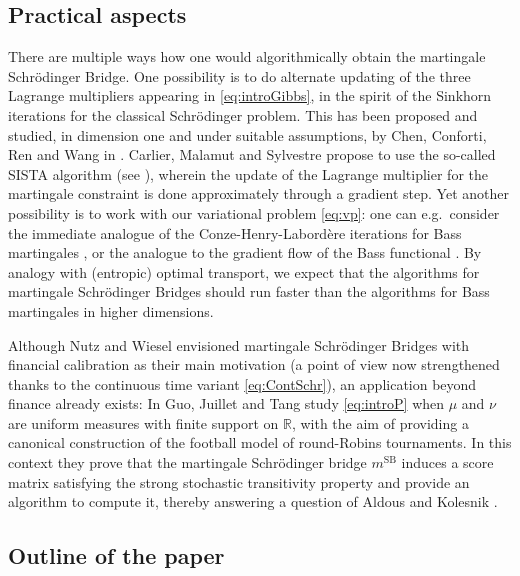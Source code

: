 \documentclass[reqno, a4paper]{amsart}
\newcommand{\msb}{m^{\text{SB}}}
\theoremstyle{plain}
\theoremstyle{definition}
\theoremstyle{remark}
\numberwithin{equation}{section}
\numberwithin{theorem}{section}
\newcommand{\R}{\mathbb{R}}
\begin{document}
{
    \subsection{Practical aspects}

   
    There are multiple ways how one would algorithmically obtain the martingale Schrödinger Bridge. One possibility is to do alternate updating of the three Lagrange multipliers appearing in \eqref{eq:introGibbs},  in the spirit of the Sinkhorn iterations for the classical Schrödinger problem. This has been proposed and studied, in dimension one and under suitable assumptions, by Chen, Conforti, Ren and Wang in \cite{ChCoReWa26}. Carlier, Malamut and Sylvestre \cite{CaMaSy25} propose to use the so-called SISTA algorithm (see \cite{CaGuGaSu23,GaNaTo25}), wherein the update of the Lagrange multiplier for the martingale constraint is done approximately through a gradient step. Yet another possibility is to work with our variational problem \eqref{eq:vp}: one can e.g.\ consider the immediate analogue of the Conze-Henry-Labord{\`e}re iterations for Bass martingales \cite{CoHe21}, or the analogue to the gradient flow of the Bass functional \cite{BaPaSc24}. By analogy with (entropic) optimal transport, we expect that the algorithms for martingale Schrödinger Bridges should run faster than the algorithms for Bass martingales in higher dimensions.

    Although Nutz and Wiesel \cite{NuWi24} envisioned martingale Schrödinger Bridges with financial calibration as their main motivation (a point of view now strengthened thanks to the continuous time variant \eqref{eq:ContSchr}), an application beyond finance already exists: 
In \cite{GuJuTa25} Guo, Juillet and Tang study \eqref{eq:introP} when $\mu$ and $\nu$ are uniform measures with finite support on $\R$, with the aim of providing a canonical construction of the football model of round-Robins tournaments. In this context they prove that the martingale Schrödinger bridge $\msb$ induces a score matrix satisfying the strong stochastic transitivity property and provide an algorithm to compute it, thereby answering a question of Aldous and Kolesnik \cite{AlKo22}. }
	
	
	
	\subsection{Outline of the paper}
	
\end{document}
